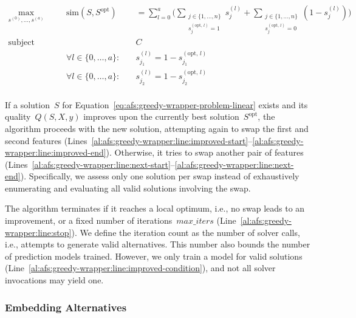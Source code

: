 \documentclass{article}
\theoremstyle{definition}
\begin{document}
\begin{equation}
	\begin{aligned}
		\max_{s^{(0)}, \dots, s^{(a)}} &&\quad \text{sim}(S, S^{\text{opt}}) &\quad = \sum_{l=0}^{a} \Big( \sum\limits_{\substack{j \in \{1, \dots, n\} \\ s^{(\text{opt, } l)}_{j} = 1}} s^{(l)}_j + \sum\limits_{\substack{j \in \{1, \dots, n\} \\ s^{(\text{opt, } l)}_{j} = 0}} \left( 1- s^{(l)}_j \right) \Big) \\
		\text{subject to:} &&\quad &\quad C \\
		&&\quad \forall l \in \{0, \dots, a\}: &\quad s^{(l)}_{j_1} = 1 - s^{(\text{opt, } l)}_{j_1} \\
		&&\quad \forall l \in \{0, \dots, a\}: &\quad s^{(l)}_{j_2} = 1 - s^{(\text{opt, } l)}_{j_2} \\
	\end{aligned}
	\label{eq:afs:greedy-wrapper-problem-linear}
\end{equation}

If a solution~$S$ for Equation~\ref{eq:afs:greedy-wrapper-problem-linear} exists and its quality~$Q(S,X,y)$ improves upon the currently best solution~$S^{\text{opt}}$, the algorithm proceeds with the new solution, attempting again to swap the first and second features (Lines~\ref{al:afs:greedy-wrapper:line:improved-start}--\ref{al:afs:greedy-wrapper:line:improved-end}).
Otherwise, it tries to swap another pair of features (Lines~\ref{al:afs:greedy-wrapper:line:next-start}--\ref{al:afs:greedy-wrapper:line:next-end}).
Specifically, we assess only one solution per swap instead of exhaustively enumerating and evaluating all valid solutions involving the swap.

The algorithm terminates if it reaches a local optimum, i.e., no swap leads to an improvement, or a fixed number of iterations~$\mathit{max\_iters}$ (Line~\ref{al:afs:greedy-wrapper:line:stop}).
We define the iteration count as the number of solver calls, i.e., attempts to generate valid alternatives.
This number also bounds the number of prediction models trained.
However, we only train a model for valid solutions (Line~\ref{al:afs:greedy-wrapper:line:improved-condition}), and not all solver invocations may yield one.

\subsubsection{Embedding Alternatives}
\label{sec:afs:approach:objectives:embedding}
\end{document}
